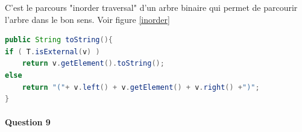 \documentclass[a4paper]{article}
\begin{document}
C'est le parcours "inorder traversal" d'un arbre binaire qui permet de parcourir l'arbre dans le bon sens. Voir figure \ref{inorder}

\begin{lstlisting}[language=Java]
public String toString(){
if ( T.isExternal(v) )
	return v.getElement().toString();
else
	return "("+ v.left() + v.getElement() + v.right() +")";
}
\end{lstlisting}

\paragraph{Question 9}
\end{document}
